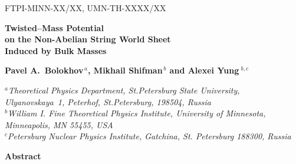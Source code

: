 \documentclass[12pt]{article}
\begin{document}
\begin{titlepage}


\begin{flushright}
FTPI-MINN-XX/XX, UMN-TH-XXXX/XX\\
\end{flushright}


\vspace{1.6cm}
\begin{center}
{\Large \bf  Twisted--Mass Potential \\
            on the Non-Abelian String World Sheet \\[2.4mm]
             Induced by Bulk Masses}
\end{center}



\vspace{2mm}

\begin{center}

 {\large
 \bf   Pavel A.~Bolokhov$^{\,a}$,  Mikhail Shifman$^{\,b}$ and \bf Alexei Yung$^{\,\,b,c}$}
\end {center}

\begin{center}

$^a${\it Theoretical Physics Department, St.Petersburg State University, Ulyanovskaya~1, 
	 Peterhof, St.Petersburg, 198504, Russia}\\
$^b${\it  William I. Fine Theoretical Physics Institute,
University of Minnesota,
Minneapolis, MN 55455, USA}\\
$^c${\it Petersburg Nuclear Physics Institute, Gatchina, St. Petersburg
188300, Russia
}
\end{center}



\vspace{1cm}
\begin{center}
{\large\bf Abstract}
\end{center}


\end{titlepage}
\end{document}
